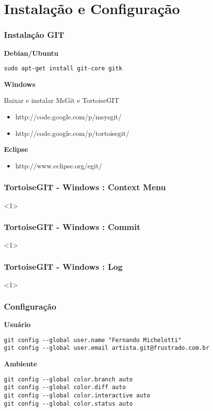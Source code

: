 \section{Instalação e Configuração}
\begin{frame}[fragile]
\frametitle{Instalação GIT}

\textbf{Debian/Ubuntu}

\begin{verbatim}
sudo apt-get install git-core gitk
\end{verbatim}

\textbf{Windows}

Baixar e instalar MsGit e TortoiseGIT

\begin{itemize}
\item http://code.google.com/p/msysgit/
\item http://code.google.com/p/tortoisegit/
\end{itemize}

\textbf{Eclipse}

\begin{itemize}
\item http://www.eclipse.org/egit/
\end{itemize}

\end{frame}


\begin{frame}
\frametitle{TortoiseGIT - Windows : Context Menu}
<1>
\end{frame}

\begin{frame}
\frametitle{TortoiseGIT - Windows : Commit}
<1>
\end{frame}

\begin{frame}
\frametitle{TortoiseGIT - Windows : Log}
<1>
\end{frame}


\begin{frame}[fragile]
\frametitle{Configuração}

\textbf{Usuário}

\scriptsize
\begin{verbatim}
git config --global user.name "Fernando Michelotti" 
git config --global user.email artista.git@frustrado.com.br
\end{verbatim}
\normalsize

\textbf{Ambiente}

\scriptsize
\begin{verbatim}
git config --global color.branch auto 
git config --global color.diff auto 
git config --global color.interactive auto 
git config --global color.status auto
\end{verbatim}
\normalsize
\end{frame}
